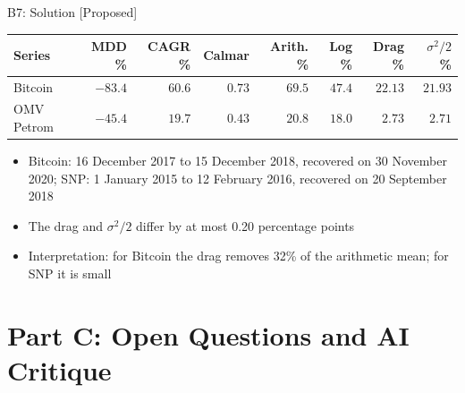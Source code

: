 \ifsolutions
\begin{frame}{B7: Solution [Proposed]}
\itemsize{\footnotesize}
\begin{center}
\footnotesize
\begin{tabular}{lrrrrrrr}
\toprule
Series & MDD \% & CAGR \% & Calmar & Arith. \% & Log \% & Drag \% & $\sigma^2/2$ \% \\
\midrule
Bitcoin & $-83.4$ & $60.6$ & $0.73$ & $69.5$ & $47.4$ & $22.13$ & $21.93$ \\
OMV Petrom & $-45.4$ & $19.7$ & $0.43$ & $20.8$ & $18.0$ & $2.73$ & $2.71$ \\
\bottomrule
\end{tabular}
\end{center}
\begin{itemize}
    \item Bitcoin: 16 December 2017 to 15 December 2018, recovered on 30 November 2020; SNP: 1 January 2015 to 12 February 2016, recovered on 20 September 2018
    \item The drag and $\sigma^2/2$ differ by at most 0.20 percentage points
    \item Interpretation: for Bitcoin the drag removes 32\% of the arithmetic mean; for SNP it is small
\end{itemize}
\end{frame}
\fi


\section{Part C: Open Questions and AI Critique}

